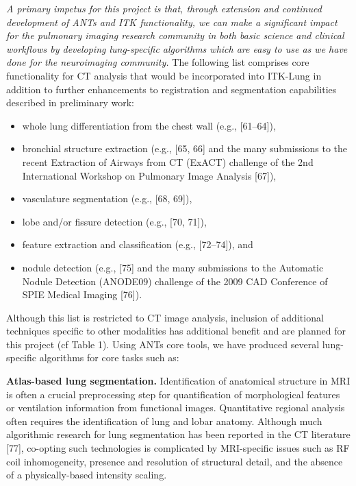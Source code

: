\documentclass[11pt,]{article}
\begin{document}
\emph{A primary impetus for this project is that, through extension and
continued development of ANTs and ITK functionality, we can make a
significant impact for the pulmonary imaging research community in both
basic science and clinical workflows by developing lung-specific
algorithms which are easy to use as we have done for the neuroimaging
community.} The following list comprises core functionality for CT
analysis that would be incorporated into ITK-Lung in addition to further
enhancements to registration and segmentation capabilities described in
preliminary work:

\begin{itemize}
\itemsep1pt\parskip0pt
\item
  whole lung differentiation from the chest wall (e.g., {[}61--64{]}),
\item
  bronchial structure extraction (e.g., {[}65, 66{]} and the many
  submissions to the recent Extraction of Airways from CT (ExACT)
  challenge of the 2nd International Workshop on Pulmonary Image
  Analysis {[}67{]}),
\item
  vasculature segmentation (e.g., {[}68, 69{]}),
\item
  lobe and/or fissure detection (e.g., {[}70, 71{]}),
\item
  feature extraction and classification (e.g., {[}72--74{]}), and
\item
  nodule detection (e.g., {[}75{]} and the many submissions to the
  Automatic Nodule Detection (ANODE09) challenge of the 2009 CAD
  Conference of SPIE Medical Imaging {[}76{]}).
\end{itemize}

Although this list is restricted to CT image analysis, inclusion of
additional techniques specific to other modalities has additional
benefit and are planned for this project (cf Table 1). Using ANTs core
tools, we have produced several lung-specific algorithms for core tasks
such as:

\textbf{Atlas-based lung segmentation.} Identification of anatomical
structure in MRI is often a crucial preprocessing step for
quantification of morphological features or ventilation information from
functional images. Quantitative regional analysis often requires the
identification of lung and lobar anatomy. Although much algorithmic
research for lung segmentation has been reported in the CT literature
{[}77{]}, co-opting such technologies is complicated by MRI-specific
issues such as RF coil inhomogeneity, presence and resolution of
structural detail, and the absence of a physically-based intensity
scaling.
\end{document}
